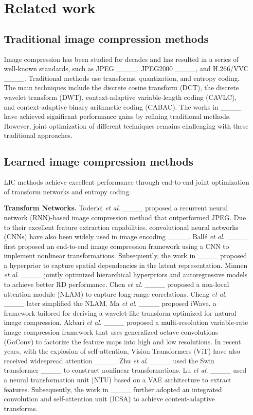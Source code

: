 \section{Related work}
\subsection{Traditional image compression methods}
Image compression has been studied for decades and has resulted in a series of well-known standards, such as JPEG ____, JPEG2000 ____, and H.266/VVC ____. Traditional methods use transforms, quantization, and entropy coding. The main techniques include the discrete cosine transform (DCT), the discrete wavelet transform (DWT), context-adaptive variable-length coding (CAVLC), and context-adaptive binary arithmetic coding (CABAC). The works in ____ have achieved significant performance gains by refining traditional methods. However, joint optimization of different techniques remains challenging with these traditional approaches.

\subsection{Learned image compression methods}
LIC methods achieve excellent performance through end-to-end joint optimization of transform networks and entropy coding.

\textbf{Transform Networks.} Toderici \textit{et al}. ____ proposed a recurrent neural network (RNN)-based image compression method that outperformed JPEG. Due to their excellent feature extraction capabilities, convolutional neural networks (CNNs) have also been widely used in image encoding ____. Ballé \textit{et al}. ____ first proposed an end-to-end image compression framework using a CNN to implement nonlinear transformations. Subsequently, the work in ____ proposed a hyperprior to capture spatial dependencies in the latent representation. Minnen \textit{et al}. ____ jointly optimized hierarchical hyperpriors and autoregressive models to achieve better RD performance. Chen \textit{et al}. ____ proposed a non-local attention module (NLAM) to capture long-range correlations. Cheng \textit{et al}. ____ later simplified the NLAM. Ma \textit{et al}. ____ proposed iWave, a framework tailored for deriving a wavelet-like transform optimized for natural image compression. Akbari \textit{et al}. ____ proposed a multi-resolution variable-rate image compression framework that uses generalized octave convolutions (GoConv) to factorize the feature maps into high and low resolutions. In recent years, with the explosion of self-attention, Vision Transformers (ViT) have also received widespread attention ____. Zhu \textit{et al}. ____ used the Swin transformer ____ to construct nonlinear transformations. Lu \textit{et al}. ____ used a neural transformation unit (NTU) based on a VAE architecture to extract features. Subsequently, the work in ____ further adopted an integrated convolution and self-attention unit (ICSA) to achieve content-adaptive transforms.

